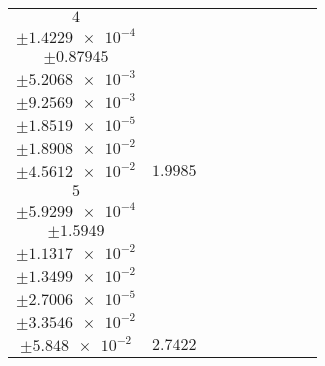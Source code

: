 \documentclass[8pt]{article}
\begin{document}
\begin{longtable}[l]{c c c c c c c c c}
$\num{4}$ & \begin{tabular}[c]{@{}c@{}}$\num{2.7191e-2}$ \\ $\pm\num{1.4229e-4}$\end{tabular} & \begin{tabular}[c]{@{}c@{}}$\num{-0.48444}$ \\ $\pm\num{0.87945}$\end{tabular} & \begin{tabular}[c]{@{}c@{}}$\num{-3.7128}$ \\ $\pm\num{5.2068e-3}$\end{tabular} & \begin{tabular}[c]{@{}c@{}}$\num{1.5708e+3}$ \\ $\pm\num{9.2569e-3}$\end{tabular} & \begin{tabular}[c]{@{}c@{}}$\num{3.1424}$ \\ $\pm\num{1.8519e-5}$\end{tabular} & \begin{tabular}[c]{@{}c@{}}$\num{2.3418}$ \\ $\pm\num{1.8908e-2}$\end{tabular} & \begin{tabular}[c]{@{}c@{}}$\num{5.012}$ \\ $\pm\num{4.5612e-2}$\end{tabular} & $\num{1.9985}$\\
$\num{5}$ & \begin{tabular}[c]{@{}c@{}}$\num{4.0452e-2}$ \\ $\pm\num{5.9299e-4}$\end{tabular} & \begin{tabular}[c]{@{}c@{}}$\num{0.20261}$ \\ $\pm\num{1.5949}$\end{tabular} & \begin{tabular}[c]{@{}c@{}}$\num{-1.9085}$ \\ $\pm\num{1.1317e-2}$\end{tabular} & \begin{tabular}[c]{@{}c@{}}$\num{1.5726e+3}$ \\ $\pm\num{1.3499e-2}$\end{tabular} & \begin{tabular}[c]{@{}c@{}}$\num{3.1461}$ \\ $\pm\num{2.7006e-5}$\end{tabular} & \begin{tabular}[c]{@{}c@{}}$\num{3.2211}$ \\ $\pm\num{3.3546e-2}$\end{tabular} & \begin{tabular}[c]{@{}c@{}}$\num{6.0701}$ \\ $\pm\num{5.848e-2}$\end{tabular} & $\num{2.7422}$\\

\end{longtable}
\end{document}
